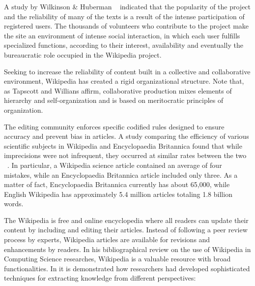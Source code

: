 A study by Wilkinson \& Huberman ~\cite{wilkinson2007assessing} indicated that the popularity of the project and the reliability of many of the texts is a result of the intense participation of registered users.
The thousands of volunteers who contribute to the project make the site an environment of intense social interaction, in which each user fulfills specialized functions, according to their interest, availability and eventually the bureaucratic role occupied in the Wikipedia project. 



Seeking to increase the reliability of content built in a collective and collaborative environment, Wikipedia has created a rigid organizational structure. 
Note that, as Tapscott and Willians \cite{tapscott2008wikinomics} affirm, collaborative production mixes elements of hierarchy and self-organization and is based on meritocratic principles of organization.

The editing community enforces specific codified rules designed to ensure accuracy and prevent bias in articles. A study comparing the efficiency of various scientific subjects in Wikipedia and Encyclopaedia Britannica found that while imprecisions were not infrequent, they occurred at similar rates between the two ~\cite{giles2005internet}. In particular, a Wikipedia science article contained an average of four mistakes, while an Encyclopaedia Britannica article included only three. 
As a matter of fact, Encyclopaedia Britannica currently has about 65,000, while English Wikipedia has approximately 5.4 million articles totaling 1.8 billion words. 



The Wikipedia is free and online encyclopedia where all readers can update their content by including and editing their articles. Instead of following a peer review process by experts, Wikipedia articles are available for revisions and enhancements by readers. In his bibliographical review on the use of Wikipedia in Computing Science researches,  Wikipedia is a  valuable resource with broad functionalities.  In \cite{medelyan2009mining} it is demonstrated how researchers had developed sophisticated techniques for extracting knowledge from different perspectives:



